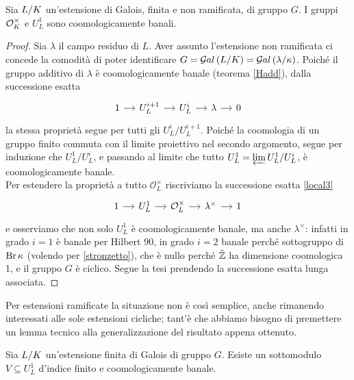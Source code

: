 \begin{theorem}
	Sia $ L/K $ un'estensione di Galois, finita e non ramificata, di gruppo $ G $. I gruppi $ \mathcal{O}_{K}^\times $ e $ U_L^1 $ sono coomologicamente banali.
\end{theorem}
\begin{proof}
	Sia $ \lambda $ il campo residuo di $ L $. Aver assunto l'estensione non ramificata ci concede la comodità di poter identificare $ G = \mathcal{G}al\left( L/K \right) = \mathcal{G}al\left( \lambda / \kappa \right) $. Poiché il gruppo additivo di $ \lambda $ è coomologicamente banale (teorema \ref{Hadd}), dalla successione esatta
	\[\begin{tikzcd}[column sep = small]
	1 \rar
	& U_L^{i+1} \rar
	& U_{L}^i \rar
	& \lambda \rar
	& 0
	\end{tikzcd}\]
	la stessa proprietà segue per tutti gli $ U^i_{L} / U^{i+1}_{L} $.
	Poiché la coomologia di un gruppo finito commuta con il limite proiettivo nel secondo argomento, segue per induzione che $ U^1_{L} / U^{i}_{L} $, e passando al limite che tutto $ U^1_L = \varprojlim U^1_{L} / U^{i}_{L} $, è coomologicamente banale. \\
	
	Per estendere la proprietà a tutto $ \mathcal{O}_{L}^\times $ riscriviamo la successione esatta \ref{local3}
	\begin{equation*}
	\begin{tikzcd}[column sep = small]
	1 \rar
	& U_L^{1} \rar
	& \mathcal{O}_{L}^\times \rar
	& \lambda^\times \rar
	&1
	\end{tikzcd}
	\end{equation*}
	e osserviamo che non solo $  U^1_L $ è coomologicamente banale, ma anche $ \lambda^\times $: infatti in grado $ i = 1 $ è banale per Hilbert 90, in grado $ i = 2 $ banale perché sottogruppo di $ \operatorname{Br} \kappa $ (volendo per \ref{stronzetto}), che è nullo perché $ \hat{\mathbb{Z}} $ ha dimensione coomologica 1, e il gruppo $ G $ è ciclico. Segue la tesi prendendo la successione esatta lunga associata.
\end{proof}



Per estensioni ramificate la situazione non è così semplice, anche rimanendo interessati alle sole estensioni cicliche; tant'è che abbiamo bisogno di premettere un lemma tecnico alla generalizzazione del risultato appena ottenuto.

\begin{lemma}
	Sia $ L/K $ un'estensione finita di Galois di gruppo $ G $. Esiste un sottomodulo $ V \subseteq U_L^1 $ d'indice finito e coomologicamente banale.
\end{lemma}

